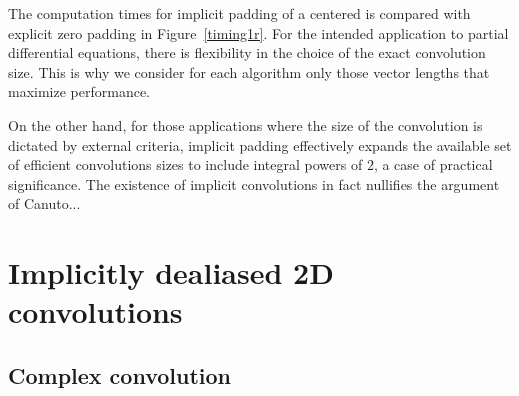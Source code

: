 \documentclass[final]{siamltex}
\def\be{\begin{dmath*}}
\def\ee{\end{dmath*}}
\def\bel{\begin{dmath}}
\def\eel{\end{dmath}}
\def\no{\hiderel}
\begin{document}

The computation times for implicit padding of a centered is compared with
explicit zero padding in Figure~\ref{timing1r}. For the intended
application to partial differential equations, there is flexibility in the
choice of the exact convolution size. This is why we consider for each
algorithm only those vector lengths that maximize performance.

On the other hand, for those applications where the size of the convolution
is dictated by external criteria, implicit padding effectively expands the
available set of efficient convolutions sizes to include integral powers of
$2$, a case of practical significance. The existence of implicit convolutions in
fact nullifies the argument of Canuto...

\section{Implicitly dealiased 2D convolutions}

\subsection{Complex convolution}
\end{document}
